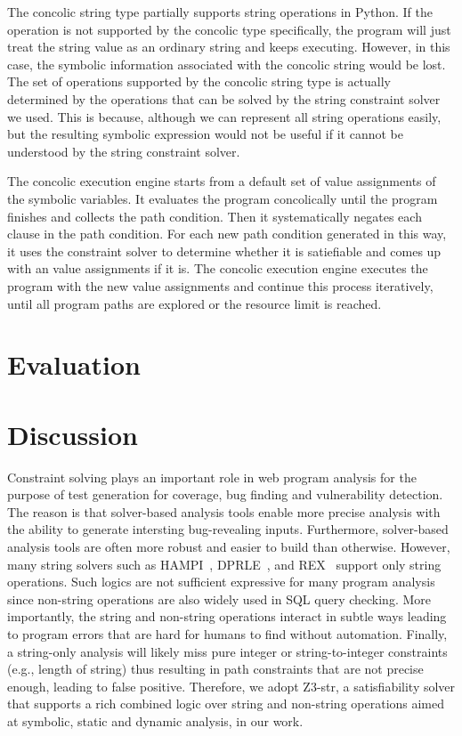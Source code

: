 \documentclass[conference]{IEEEtran}
\begin{document}
The concolic string type partially supports string operations in Python. If the operation is not supported by the concolic type specifically, the program will just treat the string value as an ordinary string and keeps executing. However, in this case, the symbolic information associated with the concolic string would be lost. The set of operations supported by the concolic string type is actually determined by the operations that can be solved by the string constraint solver we used. This is because, although we can represent all string operations easily, but the resulting symbolic expression would not be useful if it cannot be understood by the string constraint solver.

The concolic execution engine starts from a default set of value assignments of the symbolic variables. It evaluates the program concolically until the program finishes and collects the path condition. Then it systematically negates each clause in the path condition. For each new path condition generated in this way, it uses the constraint solver to determine whether it is satiefiable and comes up with an value assignments if it is. The concolic execution engine executes the program with the new value assignments and continue this process iteratively, until all program paths are explored or the resource limit is reached.


\section{Evaluation}
\label{evaluation}

\section{Discussion}
\label{discussion}
Constraint solving plays an important role in web program analysis for the purpose of test generation for coverage, bug finding and vulnerability detection. The reason is that solver-based analysis tools enable more precise analysis with the ability to generate intersting bug-revealing inputs. Furthermore, solver-based analysis tools are often more robust and easier to build than otherwise. However, many string solvers such as HAMPI~\cite{hampi}, DPRLE~\cite{dprle}, and REX~\cite{rex} support only string operations. Such logics are not sufficient expressive for many program analysis since non-string operations are also widely used in SQL query checking. More importantly, the string and non-string operations interact in subtle ways leading to program errors that are hard for humans to find without automation. Finally, a string-only analysis will likely miss pure integer or string-to-integer constraints (e.g., length of string) thus resulting in path constraints that are not precise enough, leading to false positive. Therefore, we adopt Z3-str, a satisfiability solver that supports a rich combined logic over string and non-string operations aimed at symbolic, static and dynamic analysis, in our work.
\end{document}
